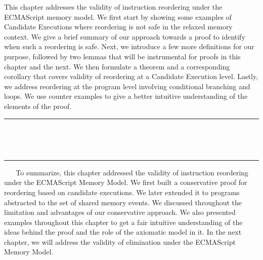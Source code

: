This chapter addresses the validity of instruction reordering under the ECMAScript memory model.
We first start by showing some examples of Candidate Executions where reordering is not safe in the relaxed memory context.  
We give a brief summary of our approach towards a proof to identify when such a reordering is safe.
Next, we introduce a few more definitions for our purpose, followed by two lemmas that will be instrumental for proofs in this chapter and the next. 
We then formulate a theorem and a corresponding corollary that covers validity of reordering at a Candidate Execution level. 
Lastly, we address reordering at the program level involving conditional branching and loops.
We use counter examples to give a better intuitive understanding of the elements of the proof.
\ \newline
\ \newline  
\hrule 
\ \newline 
\ \newline 













\ \newline
\ \newline  
\hrule 
\ \newline 
\ \newline 
To summarize, this chapter addressed the validity of instruction reordering under the ECMAScript Memory Model. 
We first built a conservative proof for reordering based on candidate executions.
We later extended it to programs abstracted to the set of shared memory events. 
We discussed throughout the limitation and advantages of our conservative approach. 
We also presented examples throughout this chapter to get a fair intuitive understanding of the ideas behind the proof and the role of the axiomatic model in it.
In the next chapter, we will address the validity of elimination under the ECMAScript Memory Model.